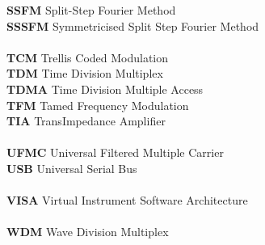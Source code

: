 \begin{multicols}{2}
\begin{tabbing}
\textbf{SSFM}		\>	Split-Step Fourier Method						\\
\textbf{SSSFM}		\>	Symmetricised Split Step Fourier Method			\\
\\
\textbf{TCM}		\>	Trellis Coded Modulation						\\
\textbf{TDM}		\>	Time Division Multiplex							\\
\textbf{TDMA}		\>	Time Division Multiple Access					\\
\textbf{TFM}		\>	Tamed Frequency Modulation						\\
\textbf{TIA}		\>	TransImpedance Amplifier						\\
\\
\textbf{UFMC}		\>	Universal Filtered Multiple Carrier				\\
\textbf{USB}		\>	Universal Serial Bus							\\
\\
\textbf{VISA}		\>	Virtual Instrument Software Architecture		\\
\\
\textbf{WDM}		\>	Wave Division Multiplex							\\
\end{tabbing}
%
\end{multicols}
\normalsize

